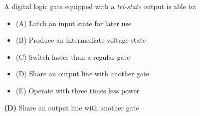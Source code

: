 


A digital logic gate equipped with a {\it tri-state} output is able to:

\begin{itemize}
\item{(A)} Latch an input state for later use
\vskip 5pt 
\item{(B)} Produce an intermediate voltage state
\vskip 5pt 
\item{(C)} Switch faster than a regular gate
\vskip 5pt 
\item{(D)} Share an output line with another gate
\vskip 5pt 
\item{(E)} Operate with three times less power
\end{itemize}







{\bf (D)} Share an output line with another gate
 










